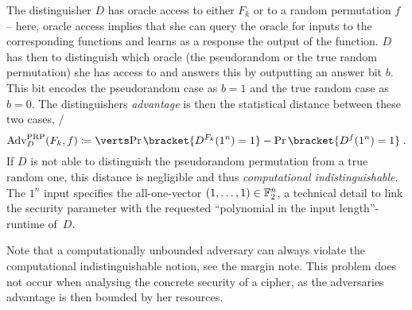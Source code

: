 The distinguisher $D$ has oracle access to either $F_k$ or to a random permutation $f$ -- here, oracle access implies that she can query the oracle for inputs to the corresponding functions and learns as a response the output of the function.
$D$ has then to distinguish which oracle (the pseudorandom or the true random permutation) she has access to and answers this by outputting an answer bit $b$.
This bit encodes the pseudorandom case as $b=1$ and the true random case as $b=0$.
The distinguishers \emph{advantage} is then the statistical distance between these two cases, \ie/
\begin{equation*}
    \mathrm{Adv}_D^\mathrm{PRP}(F_k, f) \coloneqq \abs{\Prob\bracket{D^{F_k}(1^n) = 1} - \Prob\bracket{D^{f}(1^n) = 1}}\;.
\end{equation*}
If $D$ is not able to distinguish the pseudorandom permutation from a true random one, this distance is negligible and thus \emph{computational indistinguishable}.
The $1^n$ input specifies the all-one-vector $(1, \ldots, 1) \in \mathbb{F}_2^n$, a technical detail to link the security parameter with the requested \enquote{polynomial in the input length}-runtime of~$D$.

Note that a computationally unbounded adversary can always violate the computational indistinguishable notion, see the margin note.
This problem does not occur when analysing the concrete security of a cipher, as the adversaries advantage is then bounded by her resources.

